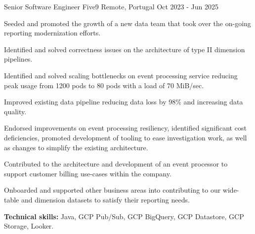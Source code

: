 

\begin{cventries}

  \cventry
    {Senior Software Engineer} %
    {Five9} %
    {Remote, Portugal} %
    {Oct 2023 - Jun 2025} %
    {
      \begin{cvitems} %
        \item {Seeded and promoted the growth of a new data team that took over the on-going reporting modernization efforts.}
        \item {Identified and solved correctness issues on the architecture of type II dimension pipelines.}
        \item {Identified and solved scaling bottlenecks on event processing service reducing peak usage from 1200 pods to 80 pods with a load of 70 MiB/sec.}
        \item {Improved existing data pipeline reducing data loss by 98\% and increasing data quality.}
        \item {Endorsed improvements on event processing resiliency, identified significant cost deficiencies, promoted development of tooling to ease investigation work, as well as changes to simplify the existing architecture. }
        \item {Contributed to the architecture and development of an event processor to support customer billing use-cases within the company.}
        \item {Onboarded and supported other business areas into contributing to our wide-table and dimension datasets to satisfy their reporting needs.}
        \item {\textbf{Technical skills:} Java, GCP Pub/Sub, GCP BigQuery, GCP Datastore, GCP Storage, Looker.}
      \end{cvitems}
    }
    

\end{cventries}
